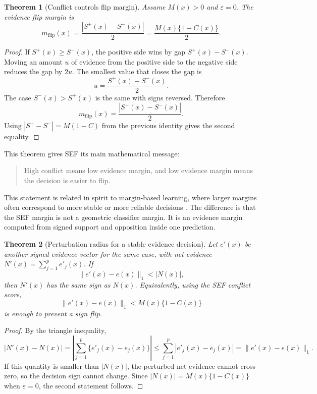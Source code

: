 \documentclass[11pt]{article}
\newtheorem{theorem}{Theorem}
\begin{document}
\begin{theorem}[Conflict controls flip margin]
Assume $M(x)>0$ and $\varepsilon=0$. The evidence flip margin is
\[
m_{\mathrm{flip}}(x)
=\frac{|S^+(x)-S^-(x)|}{2}
=\frac{M(x)\{1-C(x)\}}{2}.
\]
\end{theorem}

\begin{proof}
If $S^+(x)\geq S^-(x)$, the positive side wins by gap $S^+(x)-S^-(x)$. Moving an amount $u$ of evidence from the positive side to the negative side reduces the gap by $2u$. The smallest value that closes the gap is
\[
u=\frac{S^+(x)-S^-(x)}{2}.
\]
The case $S^-(x)>S^+(x)$ is the same with signs reversed. Therefore
\[
m_{\mathrm{flip}}(x)=\frac{|S^+(x)-S^-(x)|}{2}.
\]
Using $|S^+-S^-|=M(1-C)$ from the previous identity gives the second equality.
\end{proof}

This theorem gives SEF its main mathematical message:

\begin{quote}
High conflict means low evidence margin, and low evidence margin means the decision is easier to flip.
\end{quote}

This statement is related in spirit to margin-based learning, where larger margins often correspond to more stable or more reliable decisions \citep{schapire1998boosting}. The difference is that the SEF margin is not a geometric classifier margin. It is an evidence margin computed from signed support and opposition inside one prediction.

\begin{theorem}[Perturbation radius for a stable evidence decision]
Let $e'(x)$ be another signed evidence vector for the same case, with net evidence $N'(x)=\sum_{j=1}^p e'_j(x)$. If
\[
\|e'(x)-e(x)\|_1 < |N(x)|,
\]
then $N'(x)$ has the same sign as $N(x)$. Equivalently, using the SEF conflict score,
\[
\|e'(x)-e(x)\|_1 < M(x)\{1-C(x)\}
\]
is enough to prevent a sign flip.
\end{theorem}

\begin{proof}
By the triangle inequality,
\[
|N'(x)-N(x)|
=
\left|\sum_{j=1}^p \{e'_j(x)-e_j(x)\}\right|
\leq
\sum_{j=1}^p |e'_j(x)-e_j(x)|
=
\|e'(x)-e(x)\|_1.
\]
If this quantity is smaller than $|N(x)|$, the perturbed net evidence cannot cross zero, so the decision sign cannot change. Since $|N(x)|=M(x)\{1-C(x)\}$ when $\varepsilon=0$, the second statement follows.
\end{proof}
\end{document}
